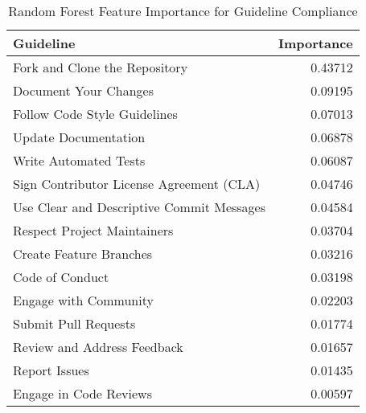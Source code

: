 \begin{table}
\caption{Random Forest Feature Importance for Guideline Compliance}
\label{tab:random_forest}
\begin{tabular}{lr}
\toprule
Guideline & Importance \\
\midrule
Fork and Clone the Repository & 0.43712 \\
Document Your Changes & 0.09195 \\
Follow Code Style Guidelines & 0.07013 \\
Update Documentation & 0.06878 \\
Write Automated Tests & 0.06087 \\
Sign Contributor License Agreement (CLA) & 0.04746 \\
Use Clear and Descriptive Commit Messages & 0.04584 \\
Respect Project Maintainers & 0.03704 \\
Create Feature Branches & 0.03216 \\
Code of Conduct & 0.03198 \\
Engage with Community & 0.02203 \\
Submit Pull Requests & 0.01774 \\
Review and Address Feedback & 0.01657 \\
Report Issues & 0.01435 \\
Engage in Code Reviews & 0.00597 \\
\bottomrule
\end{tabular}
\end{table}
